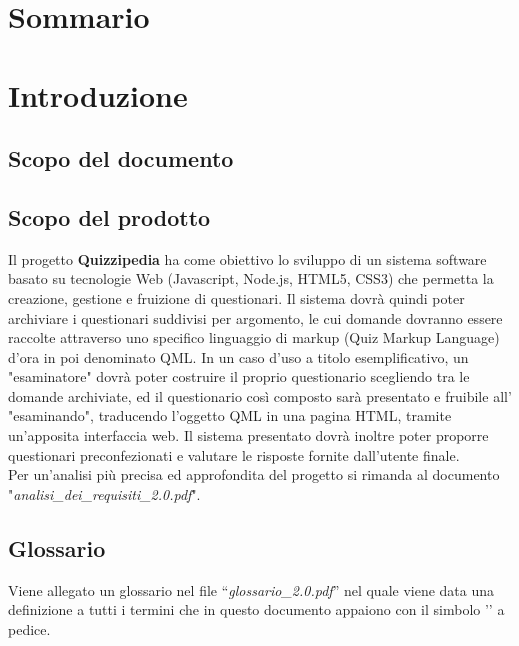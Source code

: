 \documentclass[a4paper,11pt]{article}
\begin{document}
			
	\fineregistro
	\newpage
	\fancyhead[R]{\leftmark} %
	\tableofcontents
	\newpage
	\listoffigures
	\listoftables
	
	\newpage
	
	\section*{Sommario}
	
	
	\newpage
	\section{Introduzione}
	\subsection{Scopo del documento}
	
	
	\subsection{Scopo del prodotto}
	Il progetto \textbf{Quizzipedia} ha come obiettivo lo sviluppo di un sistema software basato su tecnologie Web (Javascript\addglos, Node.js\addglos, HTML5\addglos, CSS3\addglos) che permetta la creazione, gestione e fruizione di questionari. Il sistema dovrà quindi poter archiviare i questionari suddivisi per argomento, le cui domande dovranno essere raccolte attraverso uno specifico linguaggio di markup (Quiz Markup Language) d'ora in poi denominato QML\addglos. In un caso d'uso a titolo esemplificativo, un "esaminatore" dovrà poter costruire il proprio questionario scegliendo tra le domande archiviate, ed il questionario così composto sarà presentato e fruibile all' "esaminando", traducendo l'oggetto QML in una pagina HTML\addglos, tramite un'apposita interfaccia web. Il sistema presentato dovrà inoltre poter proporre questionari preconfezionati e valutare le risposte fornite dall'utente finale.
	\\
	Per un'analisi più precisa ed approfondita del progetto si rimanda al documento\\ "\textit{analisi\_dei\_requisiti\_2.0.pdf}".
	\subsection{Glossario}
	Viene allegato un glossario nel file ``\textit{glossario\_2.0.pdf}'' nel quale viene data una definizione a tutti i termini che in questo documento appaiono con il simbolo '\addglos' a pedice.
\end{document}
